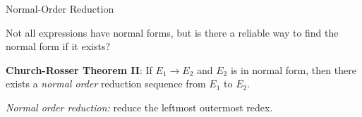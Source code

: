 \documentclass[handout]{plt}
\begin{document}
\begin{frame}{Normal-Order Reduction}

Not all expressions have normal forms, but is there a reliable way to
find the normal form if it exists?

\vspace{2pc}

\shadowstart
\begin{minipage}{1\textwidth}
\textbf{Church-Rosser Theorem II}:  If $E_1 \rightarrow E_2$ and $E_2$
is in normal form, then there exists a \emph{normal order} reduction
sequence from $E_1$ to $E_2$.
\end{minipage}
\shadowend

\emph{Normal order reduction:} reduce the leftmost outermost redex.


\end{frame}
\end{document}
